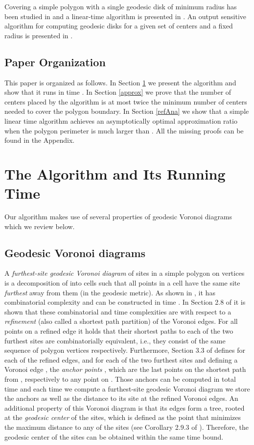 \documentclass{llncs}
\begin{document}
{Covering a simple polygon with a single geodesic disk of minimum radius has been studied in \cite{pollackGeod} and a linear-time algorithm is presented in \cite{heeKapLinear}. {An output sensitive algorithm for computing geodesic disks for a given set of centers and a fixed radius is presented in \cite{geodPac}}. 

\subsection{Paper Organization}
This paper is organized as follows. In Section \ref{algoSec} we present the algorithm and show that it runs in time . In Section \ref{approx} we  {prove that the number of centers placed by the algorithm is at most twice the minimum number of centers needed to cover the polygon boundary}.  In Section \ref{refAna} we show that a simple linear time algorithm achieves an asymptotically optimal approximation ratio when the polygon perimeter is much larger than . All the missing proofs can be found in the Appendix.
\section{The Algorithm and Its Running Time}
\label{algoSec}

Our algorithm makes use of several properties of geodesic Voronoi diagrams which we review below.


\subsection{Geodesic Voronoi diagrams}
\label{vorDia}

A \emph{furthest-site geodesic Voronoi diagram} of  sites in a simple polygon  on  vertices is a decomposition of  into cells such that all points in a cell have the same site \emph{furthest} away from them {(in the geodesic metric)}. As shown in \cite{BorisFurthest}, it has combinatorial complexity  and can be constructed in time . In Section 2.8 of \cite{BorisFurthest} it is shown that these combinatorial and time complexities are with respect to a \emph{refinement} (also called a shortest path partition) of the Voronoi edges. For all points on a refined edge it holds that their shortest paths to each of the two furthest sites are combinatorially equivalent, i.e., they consist of the same sequence of polygon vertices respectively. Furthermore, Section 3.3 of \cite{BorisFurthest} defines for each of the  refined edges, and for each of the two furthest sites  and  defining a Voronoi edge , the \emph{anchor points} ,  which are the last points on the shortest path from ,  respectively to any point on . Those anchors can be computed in total  time and each time we compute a   furthest-site geodesic Voronoi diagram we store the anchors as well as the distance to its site at the refined Voronoi edges. An additional property of this Voronoi diagram is that its edges form a tree, rooted at the \emph{geodesic center} of the  sites, which is defined as the point that minimizes the maximum distance to any of the sites (see Corollary 2.9.3 of \cite{BorisFurthest}). Therefore, the geodesic center of the sites can be obtained within the same time bound.

}
\end{document}
